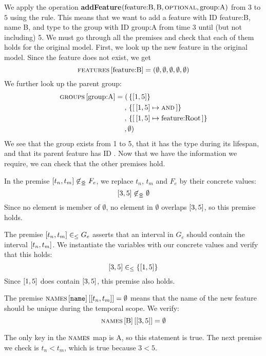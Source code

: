 We apply the operation \textbf{addFeature}$(\text{feature:B}, \text{B}, \textsc{optional}{}, \text{group:A})$ from $3$ to $5$ using the  rule. This means that we want to add a feature with ID feature:B, name B, and type \optional{} to the group with ID group:A from time 3 until (but not including) 5. We must go through all the premises and check that each of them holds for the original model. First, we look up the new feature in the original model. Since the feature does not exist, we get
\[
  \textsc{features}{} \left[ \text{feature:B} \right] = (\emptyset, \emptyset, \emptyset, \emptyset, \emptyset)
\]
We further look up the parent group:
\begin{align*}
  \lookup{\groups{}}{\text{group:A}} = ( 
                & \set{\interval{1}{5}} \\
                , \, & \set{\intervalmapping{1}{5}{\andtype}} \\
                , \, & \set{\intervalmapping{1}{5}{\text{feature:Root}}} \\
                , \, & \emptyset ) \\
\end{align*}
We see that the group exists from 1 to 5, that it has the type \andtype{} during its lifespan, and that its parent feature has ID . Now that we have the information we require, we can check that the other premises hold.

In the premise $\interval{t_n}{t_m} \not \innr F_e$, we replace $t_n$, $t_m$ and $F_e$ by their concrete values:
\[
  \interval{3}{5} \not \innr \emptyset
\]
Since no element is member of $\emptyset$, no element in $\emptyset$ overlaps $\interval{3}{5}$, so this premise holds.

The premise $\interval{t_n}{t_m} \inn G_e$ asserts that an interval in $G_e$ should contain the interval $\interval{t_n}{t_m}$. We instantiate the variables with our concrete values and verify that this holds:
\[
  \interval{3}{5} \inn \set{\interval{1}{5}}
\]
Since $\interval{1}{5}$ does contain $\interval{3}{5}$, this premise also holds.

The premise $\lookup{\lookup{\names{}}{\var{name}}}{\interval{t_n}{t_m}} = \emptyset$ means that the name of the new feature should be unique during the temporal scope.  We verify:
\[
  \lookup{\lookup{\names}{\text{B}}}{\interval{3}{5}} = \emptyset
\]

The only key in the $\textsc{names}{}$ map is A, so this statement is true. The next premise we check is $t_n < t_m$, which is true because $3 < 5$.

